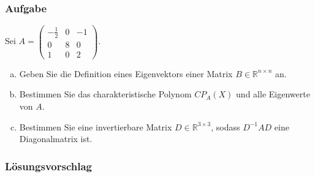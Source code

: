 \documentclass[a4paper,11pt]{scrartcl}
\newcounter{auf}
\newcommand{\Aufgabe}%
        {\addtocounter{auf}{1} \subsubsection*{\rmfamily  Aufgabe \theauf \hspace{1em}} }
\newcommand{\RR}{\mathbb{R}}
\begin{document}
\newpage
\Aufgabe
Sei $A=\begin{pmatrix} -\frac{1}{2} & 0 & -1 \\ 0 & 8 & 0 \\ 1 & 0 &2 \end{pmatrix}$. 
\begin{enumerate}[a)]
\item Geben Sie die Definition eines Eigenvektors einer Matrix $B \in \RR^{n\times n}$ an.
\item Bestimmen Sie das charakteristische Polynom $CP_A(X)$ und alle Eigenwerte von $A$.
\item Bestimmen Sie eine invertierbare Matrix $D \in \RR^{3 \times 3}$, sodass $D^{-1}AD$ eine Diagonalmatrix ist.
\end{enumerate}
%
%
\subsubsection*{Lösungsvorschlag}
\end{document}
